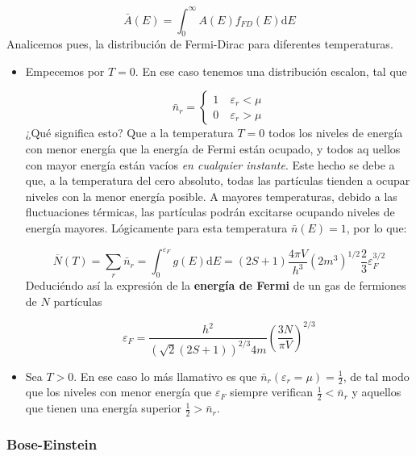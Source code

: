 \documentclass[12pt,a4paper]{article}
\numberwithin{equation}{section}
\numberwithin{figure}{section}
\newcommand{\parentesis}[1]{\left( #1  \right)}
\newcommand{\D}{\mathrm{d}}
\theoremstyle{definition}
\begin{document}
\begin{equation}
\bar{A} (E) = \int_0^\infty A(E) f_{FD}(E) \D E
\end{equation}
Analicemos pues, la distribución de Fermi-Dirac para diferentes temperaturas. 
\begin{itemize}
\item Empecemos por $T=0$. En ese caso tenemos una distribución escalon, tal que

\begin{equation}
\bar{n}_r = \left\lbrace \begin{array}{ll}
1 & \ \varepsilon_r < \mu \\
0 & \ \varepsilon_r > \mu
\end{array} \right.
\end{equation}
¿Qué significa esto? Que a la temperatura $T=0$ todos los niveles de energía con menor energía que la energía de Fermi están ocupado, y todos aq	uellos con mayor energía están vacíos \textit{en cualquier instante}. Este hecho se debe a que, a la temperatura del cero absoluto, todas las partículas tienden a ocupar niveles con la menor energía posible. A mayores temperaturas, debido a las fluctuaciones térmicas, las partículas podrán excitarse ocupando niveles de energía mayores. Lógicamente para esta temperatura $\bar{n} (E) = 1$, por lo que:

\begin{equation}
\overline{N} (T) = \sum_r \bar{n}_r = \int_0^{\varepsilon_F} g(E) \D E = (2S+1) \frac{4\pi V}{h^3} (2m^3)^{1/2} \frac{2}{3} \varepsilon_F^{3/2}
\end{equation}
Deduciéndo así la expresión de la \textbf{energía de Fermi} de un gas de fermiones de $N$ partículas 

\begin{equation}
\varepsilon_F = \frac{h^2}{(\sqrt{2}(2S+1))^{2/3} 4m} \parentesis{\frac{3N}{\pi V}}^{2/3}
\end{equation}

\item Sea $T>0$. En ese caso lo más llamativo es que $\bar{n}_r(\varepsilon_r = \mu) = \frac{1}{2}$, de tal modo que los niveles con menor energía que $\varepsilon_F$  siempre verifican $\frac{1}{2}<\bar{n}_r$ y aquellos que tienen una energía superior $\frac{1}{2}>\bar{n}_r$.
\end{itemize}

\subsubsection{Bose-Einstein}
\end{document}
